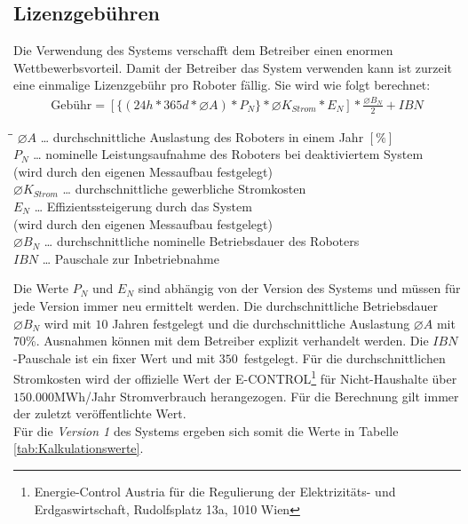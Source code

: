 \subsection{Lizenzgebühren}
Die Verwendung des Systems verschafft dem Betreiber einen enormen Wettbewerbsvorteil. Damit der Betreiber das System verwenden kann ist zurzeit eine einmalige Lizenzgebühr pro Roboter fällig. Sie wird wie folgt berechnet:\\
\begin{align*}
	\text{Gebühr} = [\{(24h * 365d * \varnothing A)*P_N\}*\varnothing K_{Strom}*E_N]*\frac{\varnothing B_N}{2} + IBN
\end{align*}
\begin{tabbing}
	\hspace{1,8cm}\=\hspace{0,6cm}\=\kill
	$\varnothing A$ \> \dots \> durchschnittliche Auslastung des Roboters in einem Jahr $[\%]$\\ 
	$P_N$\> \dots \> nominelle Leistungsaufnahme des Roboters bei deaktiviertem System\\ 
	\> \> (wird durch den eigenen Messaufbau festgelegt)\\
	$\varnothing K_{Strom}$\> \dots \> durchschnittliche gewerbliche Stromkosten\\ 
	$E_N$\> \dots \> Effizientssteigerung durch das System\\ 
	\> \> (wird durch den eigenen Messaufbau festgelegt) \\
	$\varnothing B_N$ \> \dots \> durchschnittliche nominelle Betriebsdauer des Roboters \\
	$IBN$ \> \dots \> Pauschale zur Inbetriebnahme
\end{tabbing}
Die Werte $P_N$ und $E_N$ sind abhängig von der Version des Systems und müssen für jede Version immer neu ermittelt werden. Die durchschnittliche Betriebsdauer $\varnothing B_N$ wird mit $10$ Jahren festgelegt und die durchschnittliche Auslastung $\varnothing A$ mit $70$\%. Ausnahmen können mit dem Betreiber explizit verhandelt werden. Die $IBN$-Pauschale ist ein fixer Wert und mit $350$\officialeuro~festgelegt. Für die durchschnittlichen Stromkosten wird der offizielle Wert der \textsf{E-CONTROL}\footnote{Energie-Control Austria für die Regulierung der Elektrizitäts- und Erdgaswirtschaft, Rudolfsplatz 13a, 1010 Wien} für Nicht-Haushalte über $150.000$MWh/Jahr Stromverbrauch herangezogen. Für die Berechnung gilt immer der zuletzt veröffentlichte Wert.\\
Für die \textit{Version 1} des Systems ergeben sich somit die Werte in Tabelle \ref{tab:Kalkulationswerte}.
